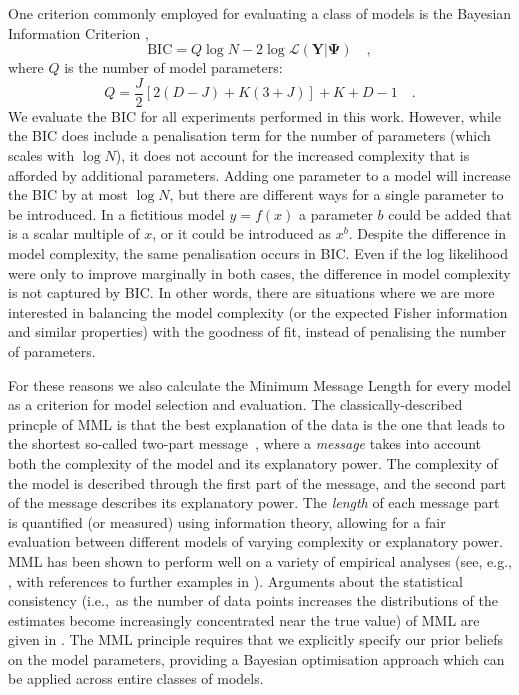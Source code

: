 \documentclass[twocolumn]{aastex62}
\newcommand{\vect}[1]{\boldsymbol{\mathbf{#1}}}
\renewcommand{\vec}[1]{\vect{#1}}
\newcommand{\data}{\textbf{Y}}
\newcommand{\NumDimensions}{D}
\newcommand{\NumLatentFactors}{J}
\newcommand{\NumComponents}{K}
\begin{document}
One criterion commonly employed for evaluating a class of models is the 
Bayesian Information Criterion \citep[BIC;][]{Schwarz:1978}, 
\begin{equation}
	\textrm{BIC} = Q\log{N} - 2\log\mathcal{L}\left(\data|\vec\Psi\right) \quad , \label{eq:bic}
\end{equation} 
\noindent{}where $Q$ is the number of model parameters:
\begin{equation}
	Q = \frac{\NumLatentFactors}{2}\left[2\left(\NumDimensions - \NumLatentFactors\right) + \NumComponents\left(3 + \NumLatentFactors\right)\right] + \NumComponents + \NumDimensions - 1 \quad .
\end{equation}
\noindent{}We evaluate the BIC for all experiments performed in this work.
However, while the BIC does include a penalisation term for the number of
parameters (which scales with $\log{N}$), it does not account for the increased
complexity that is afforded by additional parameters. Adding one parameter
to a model will increase the BIC by at most $\log{N}$, but there are different
ways for a single parameter to be introduced. In a fictitious model $y=f(x)$
a parameter $b$ could be added that is a scalar multiple of $x$, or it could be
introduced as $x^b$. Despite the difference in model complexity, the same
penalisation occurs in BIC. Even if the log likelihood were only to improve
marginally in both cases, the difference in model complexity is not captured
by BIC. In other words, there are situations where we are more interested in
balancing the model complexity (or the expected Fisher information and similar
properties) with the goodness of fit, instead of penalising the number of 
parameters.


For these reasons we also calculate the Minimum Message Length \citep[MML;][]{Wallace:2005}
for every model as a criterion for model selection and evaluation. 
The classically-described princple of MML is that the best explanation of the
data is the one that leads to the shortest so-called two-part message~\cite{Wallace:2005}, 
where a \textit{message} takes into account both the complexity of the model 
and its explanatory power. The complexity of the model is described through
the first part of the message, and the second part of the message describes
its explanatory power. The \emph{length} of each message part is quantified
(or measured) using information theory, allowing for a fair evaluation between
different models of varying complexity or explanatory power. MML has been 
shown to perform well on a variety of empirical analyses (see, e.g., 
\cite{viswanathan1999finding,fitzgibbon2004minimum}, with references to 
further examples in \cite{Wallace:2005,dowe2007bayes,Dowe2008a,Dowe2011a}).
Arguments about the statistical consistency (i.e.,~as the number of data 
points increases the distributions of the estimates become increasingly 
concentrated near the true value) of MML are given in \cite{DoweWallace1997a,Dowe2011a}.
The MML principle requires that we explicitly specify our prior beliefs on the
model parameters, providing a Bayesian optimisation approach which can be
applied across entire classes of models.
\end{document}
